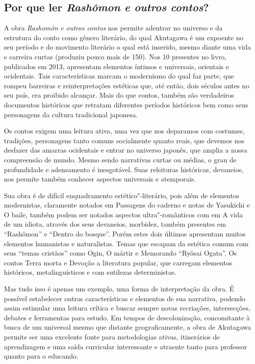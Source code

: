 \documentclass[12pt]{extarticle}
\begin{document}


\subsection{Por que ler \textit{Rashômon e outros contos}?}

A obra \emph{Rashomôn e outros contos} nos permite adentrar no universo e da estrutura
do conto como gênero literário, do qual Akutagawa é um expoente no seu período
e do movimento literário o qual está inserido, mesmo diante uma vida e carreira
curtas (produziu pouco mais de 150).  Nos 10 presentes no livro, publicados em
2013, apresentam elementos íntimos e universais, orientais e ocidentais. Tais
características marcam o modernismo do qual faz parte, que rompeu barreiras e
reinterpretações estéticas que, até então, dois séculos antes no seu país, era
proibido alcançar. Mais do que contos, também são verdadeiros documentos
históricos que retratam diferentes períodos históricos bem como seus
personagens da cultura tradicional japonesa.

Os contos exigem uma leitura ativa, uma vez que nos deparamos com costumes,
tradições, personagens tanto comuns socialmente quanto reais, que devemos nos
desfazer das amarras ocidentais e entrar no universo japonês, que amplia a
nossa compreensão de mundo. Mesmo sendo narrativas curtas ou médias, o grau de
profundidade e adensamento é inesgotável.  Suas releituras históricas,
devaneios, nos permite também conhecer aspectos universais e atemporais.

Sua obra é de difícil enquadramento estético"-literário, pois além de elementos
modernistas, claramente notados em Passagens do caderno e notas de Yasukichi e
O baile, também podem ser notados aspectos ultra"-românticos com em A vida de
um idiota, através dos seus devaneios, morbidez, também presentes em ``Rashômon'' e
``Dentro do bosque''. Porém estes dois últimos apresentam muitos elementos
humanistas e naturalistas.  Temas que escapam da estética comum com seus
``temas cristãos'' como Ogin, O mártir e Memorando ``Ryôsai Ogata''. Os contos
Terra morta e Devoção a literatura popular, que carregam elementos históricos,
metalinguísticos e com sutilezas deterministas.

Mas tudo isso é apenas um exemplo, uma forma de interpretação da obra. É
possível estabelecer outras características e elementos de sua narrativa,
podendo assim estimular uma leitura crítica e buscar sempre novas recriações,
intersecções, debates e ferramentas para estudo. Em tempos de descolonização,
concomitante à busca de um universal mesmo que distante geograficamente, a obra
de Akutagawa permite ser uma excelente fonte para metodologias ativas,
itinerários de aprendizagem e uma saída curricular interessante e atraente
tanto para professor quanto para o educando.
\end{document}
